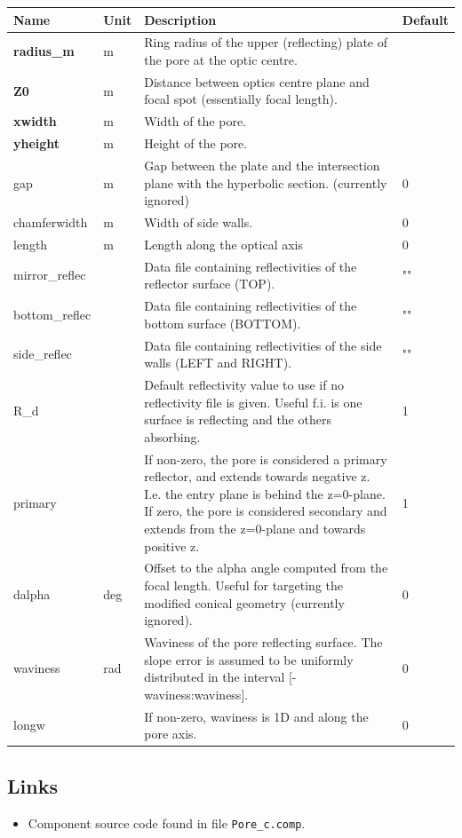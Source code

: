 \begin{longtable}{p{}p{}p{}p{}}
\toprule
\textbf{Name} & \textbf{Unit} & \textbf{Description} & \textbf{Default} \\
\midrule
\endhead
\textbf{radius\_m} & m & Ring radius of the upper (reflecting) plate of the pore at the optic centre. &  \\
\textbf{Z0} & m & Distance between optics centre plane and focal spot (essentially focal length). &  \\
\textbf{xwidth} & m & Width of the pore. &  \\
\textbf{yheight} & m & Height of the pore. &  \\
gap & m & Gap between the plate and the intersection plane with the hyperbolic section. (currently ignored) & 0 \\
chamferwidth & m & Width of side walls. & 0 \\
length & m & Length along the optical axis & 0 \\
mirror\_reflec &   & Data file containing reflectivities of the reflector surface (TOP). & "" \\
bottom\_reflec &   & Data file containing reflectivities of the bottom surface (BOTTOM). & "" \\
side\_reflec &   & Data file containing reflectivities of the side walls (LEFT and RIGHT). & "" \\
R\_d &   & Default reflectivity value to use if no reflectivity file is given. Useful f.i. is one surface is reflecting and the others absorbing. & 1 \\
primary &   & If non-zero, the pore is considered a primary reflector, and extends towards negative z. I.e. the entry plane is behind the z=0-plane. If zero, the pore is considered secondary and extends from the z=0-plane and towards positive z. & 1 \\
dalpha & deg & Offset to the alpha angle computed from the focal length. Useful for targeting the modified conical geometry (currently ignored). & 0 \\
waviness & rad & Waviness of the pore reflecting surface. The slope error is assumed to be uniformly distributed in the interval [-waviness:waviness]. & 0 \\
longw &   & If non-zero, waviness is 1D and along the pore axis. & 0 \\
\bottomrule
\end{longtable}

\subsection*{Links}
\begin{itemize}
  \item Component source code found in file \texttt{Pore\_c.comp}.
\end{itemize}
